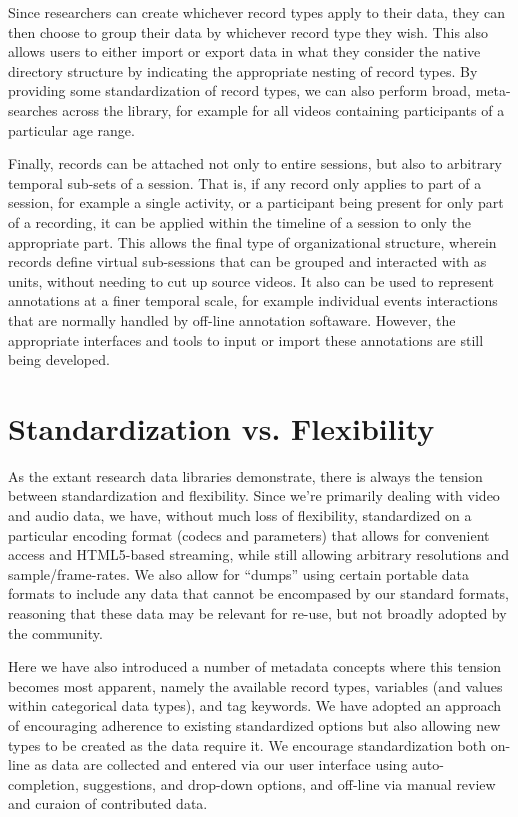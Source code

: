 \documentclass{sig-alternate}
\begin{document}
Since researchers can create whichever record types apply to their data, they can then choose to group their data by whichever record type they wish.
This also allows users to either import or export data in what they consider the native directory structure by indicating the appropriate nesting of record types.
By providing some standardization of record types, we can also perform broad, meta-searches across the library, for example for all videos containing participants of a particular age range.

Finally, records can be attached not only to entire sessions, but also to arbitrary temporal sub-sets of a session.
That is, if any record only applies to part of a session, for example a single activity, or a participant being present for only part of a recording, it can be applied within the timeline of a session to only the appropriate part.
This allows the final type of organizational structure, wherein records define virtual sub-sessions that can be grouped and interacted with as units, without needing to cut up source videos.
It also can be used to represent annotations at a finer temporal scale, for example individual events interactions that are normally handled by off-line annotation softaware.
However, the appropriate interfaces and tools to input or import these annotations are still being developed.

\section{Standardization vs. Flexibility}

As the extant research data libraries demonstrate, there is always the tension between standardization and flexibility.
Since we're primarily dealing with video and audio data, we have, without much loss of flexibility, standardized on a particular encoding format (codecs and parameters) that allows for convenient access and HTML5-based streaming, while still allowing arbitrary resolutions and sample/frame-rates.
We also allow for ``dumps'' using certain portable data formats to include any data that cannot be encompased by our standard formats, reasoning that these data may be relevant for re-use, but not broadly adopted by the community.

Here we have also introduced a number of metadata concepts where this tension becomes most apparent, namely the available record types, variables (and values within categorical data types), and tag keywords.
We have adopted an approach of encouraging adherence to existing standardized options but also allowing new types to be created as the data require it.
We encourage standardization both on-line as data are collected and entered via our user interface using auto-completion, suggestions, and drop-down options, and off-line via manual review and curaion of contributed data.
\end{document}
